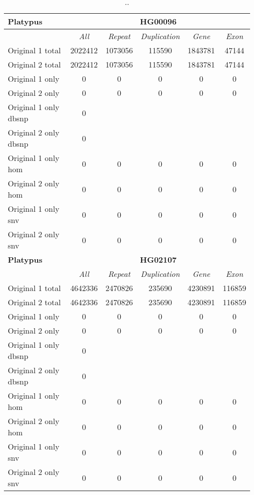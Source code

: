 \begin{table}[htb]
\begin{center}
\begin{tabular}{|l|c||c|c|c|c|}
\hline
{\bf Platypus} & \multicolumn{5}{|c|}{\bf HG00096} \\
\hline
\cline{2-6}
{\bf} & {\it All} & {\it Repeat} & {\it Duplication} & {\it Gene} & {\it Exon} \\
\hline
Original 1 total & 2022412 & 1073056 & 115590 & 1843781 & 47144\\ 
\hline
Original 2 total & 2022412 & 1073056 & 115590 & 1843781 & 47144\\ 
\hline
Original 1 only & 0 & 0 & 0 & 0 & 0\\ 
\hline
Original 2 only & 0 & 0 & 0 & 0 & 0\\ 
\hline
Original 1 only dbsnp & 0 &  &  &  & \\ 
\hline
Original 2 only dbsnp & 0 &  &  &  & \\ 
\hline
Original 1 only hom & 0 & 0 & 0 & 0 & 0\\ 
\hline
Original 2 only hom & 0 & 0 & 0 & 0 & 0\\ 
\hline
Original 1 only snv & 0 & 0 & 0 & 0 & 0\\ 
\hline
Original 2 only snv & 0 & 0 & 0 & 0 & 0\\ 
\hline
\hline
{\bf Platypus} & \multicolumn{5}{|c|}{\bf HG02107} \\
\hline
\cline{2-6}
{\bf} & {\it All} & {\it Repeat} & {\it Duplication} & {\it Gene} & {\it Exon} \\
\hline
Original 1 total & 4642336 & 2470826 & 235690 & 4230891 & 116859\\ 
\hline
Original 2 total & 4642336 & 2470826 & 235690 & 4230891 & 116859\\ 
\hline
Original 1 only & 0 & 0 & 0 & 0 & 0\\ 
\hline
Original 2 only & 0 & 0 & 0 & 0 & 0\\ 
\hline
Original 1 only dbsnp & 0 &  &  &  & \\ 
\hline
Original 2 only dbsnp & 0 &  &  &  & \\ 
\hline
Original 1 only hom & 0 & 0 & 0 & 0 & 0\\ 
\hline
Original 2 only hom & 0 & 0 & 0 & 0 & 0\\ 
\hline
Original 1 only snv & 0 & 0 & 0 & 0 & 0\\ 
\hline
Original 2 only snv & 0 & 0 & 0 & 0 & 0\\ 
\hline
\end{tabular}
\end{center}
\caption{ .. }
\label{tab:orig-vs-orig2-platypus}
\end{table}

